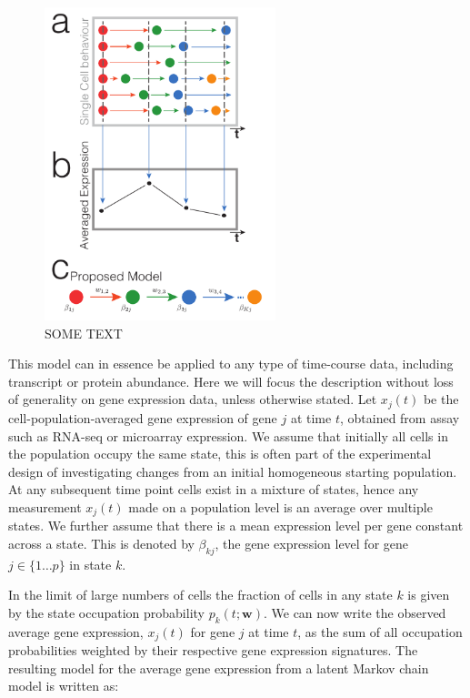 \begin{figure}[h]
  \centering
  \includegraphics[width=0.6\textwidth]{pics/model_fig.pdf}
  \caption{SOME TEXT}
  \label{fig:model-sketch}
\end{figure}

This model can in essence be applied to any type of time-course data, including transcript or protein abundance. Here we will focus the description without loss of generality on gene expression data, unless otherwise stated. Let $x_j(t)$ be the cell-population-averaged gene expression of gene $j$ at time $t$, obtained from assay
such as RNA-seq or microarray expression. We assume that initially all cells in the population occupy the same state, this is often part of the experimental design of investigating changes from an initial homogeneous starting population. At any subsequent time point cells exist in a mixture of states, hence any measurement $x_j(t)$ made on a population level is an average over multiple states. We further assume that there is a mean expression level per gene constant across a state. This is denoted by $\beta_{kj}$, the gene expression level for gene $j \in \lbrace 1 \ldots p \rbrace$ in state $k$.

In the limit of large numbers of cells the fraction of cells in any state $k$ is given by the state occupation probability $p_k(t;\mathbf{w})$. We can now write the observed average gene expression, $x_j(t)$ for gene $j$ at time $t$, as the sum of all occupation probabilities weighted by their respective gene expression signatures. The resulting model for the average gene expression from a latent Markov chain model is written as:

